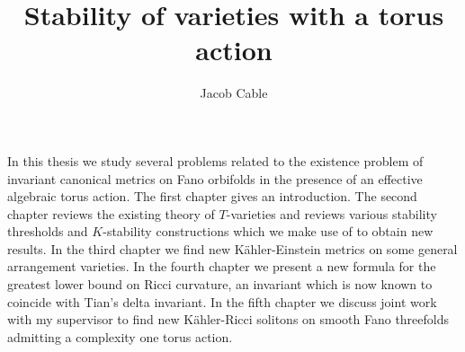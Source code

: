 



\title{Stability of varieties with a torus action}
\author{Jacob Cable}
\def\wordcount{: lots}


\beforeabstract

In this thesis we study several problems related to the existence problem of invariant canonical metrics on Fano orbifolds in the presence of an effective algebraic torus action. The first chapter gives an introduction. The second chapter reviews the existing theory of \(T\)-varieties and reviews various stability thresholds and \(K\)-stability constructions which we make use of to obtain new results. In the third chapter we find new K\"ahler-Einstein metrics on some general arrangement varieties. In the fourth chapter we present a new formula for the greatest lower bound on Ricci curvature, an invariant which is now known to coincide with Tian's delta invariant. In the fifth chapter we discuss joint work with my supervisor to find new K\"ahler-Ricci solitons on smooth Fano threefolds admitting a complexity one torus action. 

\afterabstract



\afterpreface





%



%

%
\appendix
%
%
 

